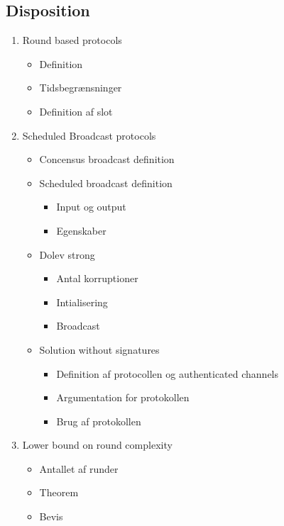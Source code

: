 \documentclass[a4, english]{article}
\begin{document}
\subsection{Disposition}
\begin{enumerate}
	\item Round based protocols
  \begin{itemize}
  	\item Definition
    \item Tidsbegrænsninger
    \item Definition af slot 
  \end{itemize}
  \item Scheduled Broadcast protocols
  \begin{itemize}
  	\item Concensus broadcast definition
    \item Scheduled broadcast definition
    \begin{itemize}
      \item Input og output
    	\item Egenskaber
    \end{itemize}
    \item Dolev strong
    \begin{itemize}
      \item Antal korruptioner 
    	\item Intialisering
      \item Broadcast
    \end{itemize}
    \item Solution without signatures
    \begin{itemize}
    	\item Definition af protocollen og authenticated channels 
      \item Argumentation for protokollen
      \item Brug af protokollen
    \end{itemize}
  \end{itemize}
  \item Lower bound on round complexity 
  \begin{itemize}
  	\item Antallet af runder
    \item Theorem
    \item Bevis
  \end{itemize}
\end{enumerate}
\newpage
\end{document}

